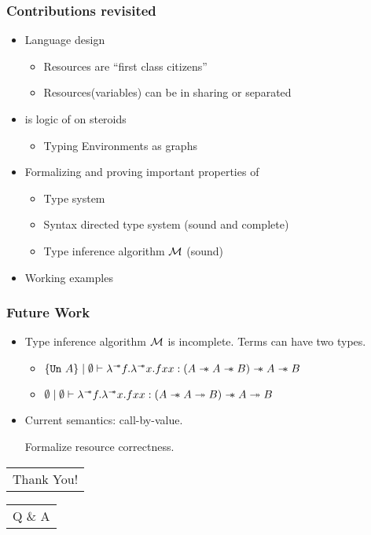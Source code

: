 \begin{frame}
  \frametitle{Contributions revisited}

  \begin{itemize}

  \item {\color{red}Language design}
    \begin{itemize}
    \item {\color{red}Resources are ``first class citizens''}
    \item {\color{red}Resources(variables) can be in sharing or separated}
    \end{itemize}

  \item {\color{red}\qub{} is logic of \BI on steroids}
    \begin{itemize}
    \item {\color{red}Typing Environments as graphs}
    \end{itemize}
  \item Formalizing and proving important properties of \qub{}
    \begin{itemize}
    \item Type system
    \item Syntax directed type system (sound and complete)
    \item Type inference algorithm $\mathcal{M}$ (sound)
    \end{itemize}
  \item {\color{red}Working examples}

  \end{itemize}

\end{frame}

\begin{frame}[fragile, c]
  \frametitle{Future Work}
  \begin{itemize}
  \item Type inference algorithm $\mathcal{M}{}$ is incomplete.
    Terms can have two types.
    \begin{itemize}
    \item $\{\texttt{Un}\ A\} \mid \emptyset \vdash \lambda^{\sepimp}f. \lambda^{\sepimp}x. f x x: (A \sepimp A \sepimp B) \sepimp A \sepimp B$
    \item $\emptyset \mid \emptyset \vdash \lambda^{\mathrel{-\mkern-6mu*}}f. \lambda^{\mathrel{-\mkern-6mu*}}x. f x x: (A \mathrel{-\mkern-6mu*} A \twoheadrightarrow B) \mathrel{-\mkern-6mu*} A \twoheadrightarrow B$
    \end{itemize}
  \item Current semantics: call-by-value.

    Formalize resource correctness.
  \end{itemize}
\end{frame}



\begin{frame}[fragile, c]
  \begin{center}
    \begin{tabular}[h]{c}
      \Huge  Thank You!
    \end{tabular}
  \end{center}
\end{frame}

\begin{frame}[fragile, c]
  \begin{center}
    \begin{tabular}[h]{c}
      \Huge Q \& A
    \end{tabular}
  \end{center}
\end{frame}